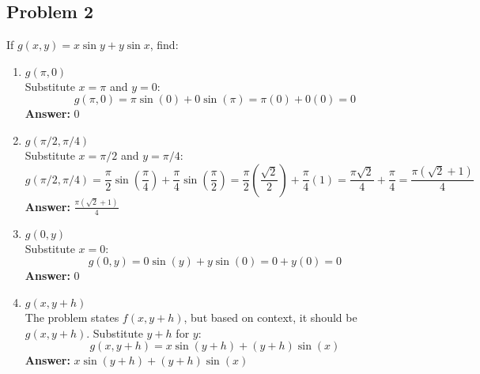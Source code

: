 \documentclass{article}
\begin{document}
\subsection{Problem 2}
If $g(x, y) = x \sin y + y \sin x$, find:
\begin{enumerate}[label=\alph*.]
    \item \textbf{$g(\pi, 0)$} \\
    Substitute $x=\pi$ and $y=0$:
    \[ g(\pi, 0) = \pi \sin(0) + 0 \sin(\pi) = \pi(0) + 0(0) = 0 \]
    \textbf{Answer:} $0$

    \item \textbf{$g(\pi/2, \pi/4)$} \\
    Substitute $x=\pi/2$ and $y=\pi/4$:
    \[ g(\pi/2, \pi/4) = \frac{\pi}{2} \sin(\frac{\pi}{4}) + \frac{\pi}{4} \sin(\frac{\pi}{2}) = \frac{\pi}{2} \left(\frac{\sqrt{2}}{2}\right) + \frac{\pi}{4} (1) = \frac{\pi\sqrt{2}}{4} + \frac{\pi}{4} = \frac{\pi(\sqrt{2}+1)}{4} \]
    \textbf{Answer:} $\frac{\pi(\sqrt{2}+1)}{4}$

    \item \textbf{$g(0, y)$} \\
    Substitute $x=0$:
    \[ g(0, y) = 0 \sin(y) + y \sin(0) = 0 + y(0) = 0 \]
    \textbf{Answer:} $0$

    \item \textbf{$g(x, y+h)$} \\
    The problem states $f(x, y+h)$, but based on context, it should be $g(x, y+h)$. Substitute $y+h$ for $y$:
    \[ g(x, y+h) = x \sin(y+h) + (y+h) \sin(x) \]
    \textbf{Answer:} $x \sin(y+h) + (y+h) \sin(x)$
\end{enumerate}
\end{document}
